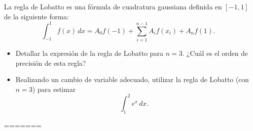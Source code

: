 \begin{EjerciciosPropuestos}
  \begin{problema}
    La regla de Lobatto es una fórmula de cuadratura gaussiana
    definida en $[-1,1]$ de la siguiente forma:
    \begin{equation*}
      \int_{-1}^1 f(x)\, dx = A_0 f(-1) + \sum_{i=1}^{n-1} A_if(x_i) +
      A_nf(1).
    \end{equation*}
    \begin{itemize}
    \item Detallar la expresión de la regla de Lobatto para
      $n=3$. ¿Cuál es el orden de precisión de esta regla?
    \item Realizando un cambio de variable adecuado, utilizar la regla
      de Lobatto (con $n=3$) para estimar
      \begin{equation*}
        \int_1^2 e^x\, dx.
      \end{equation*}
    \end{itemize}
  \end{problema}
\end{EjerciciosPropuestos}



=======


